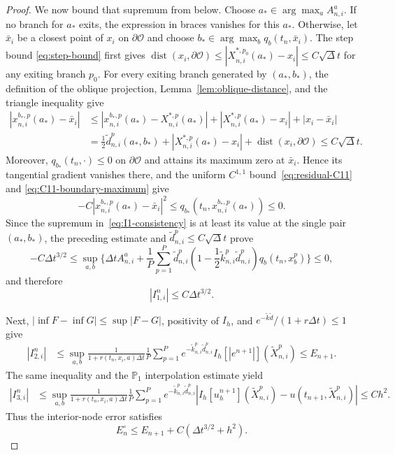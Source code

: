 \documentclass[10pt,a4paper]{amsart}
\newcommand{\cO}{\mathcal{O}}
\newcommand{\dist}{\operatorname{dist}}
\newcommand{\dt}{\Delta t}
\begin{document}
\begin{proof}
		We now bound that supremum from below.  Choose
		$a_*\in\arg\max_a A_{n,i}^a$.  If no branch for $a_*$ exits, the expression
		in braces vanishes for this $a_*$.  Otherwise, let $\bar x_i$ be a closest
		point of $x_i$ on $\partial\cO$ and choose
		$b_*\in\arg\max_b q_b(t_n,\bar x_i)$.  The step bound
		\eqref{eq:step-bound} first gives
		$\dist(x_i,\partial\cO)\le|X_{n,i}^{*,p_0}(a_*)-x_i|\le C\sqrt\dt$
		for any exiting branch $p_0$.  For every exiting branch generated by
		$(a_*,b_*)$, the definition of the oblique projection,
		Lemma~\ref{lem:oblique-distance}, and the triangle inequality give
		\[
		\begin{aligned}
			|x_{n,i}^{b_*,p}(a_*)-\bar x_i|
			&\le |x_{n,i}^{b_*,p}(a_*)-X_{n,i}^{*,p}(a_*)|
			+|X_{n,i}^{*,p}(a_*)-x_i|+|x_i-\bar x_i|\\
			&=\frac12\widetilde d_{n,i}^p(a_*,b_*)
			+|X_{n,i}^{*,p}(a_*)-x_i|
			+\dist(x_i,\partial\cO)
			\le C\sqrt\dt .
		\end{aligned}
		\]
		Moreover, $q_{b_*}(t_n,\cdot)\le0$ on $\partial\cO$ and attains its maximum
		zero at $\bar x_i$.  Hence its tangential gradient vanishes there, and the
		uniform $C^{1,1}$ bound~\eqref{eq:residual-C11} and
		\eqref{eq:C11-boundary-maximum} give
		\[
		-C|x_{n,i}^{b_*,p}(a_*)-\bar x_i|^2
		\le q_{b_*}(t_n,x_{n,i}^{b_*,p}(a_*))\le0.
		\]
		Since the supremum in~\eqref{eq:I1-consistency} is at least its value at
		the single pair $(a_*,b_*)$, the preceding estimate and
		$\widetilde d_{n,i}^p\le C\sqrt\dt$ prove
		\[
		-C\dt^{3/2}\le
		\sup_{a,b}\Biggl\{\dt A_{n,i}^a
		+\frac1P\sum_{p=1}^P\widetilde d_{n,i}^p
		\left(1-\frac12\widetilde k_{n,i}^p\widetilde d_{n,i}^p\right)
		q_b(t_n,x_b^p)\Biggr\}\le0,
		\]
		and therefore
		\begin{equation}
			|I_{1,i}^n|\le C\dt^{3/2}.
			\label{eq:I1-bound}
		\end{equation}
		
		Next, $|\inf F-\inf G|\le\sup|F-G|$, positivity of $I_h$, and
		$e^{-\widetilde k\widetilde d}/(1+r\dt)\le1$ give
		\begin{align}
			|I_{2,i}^n|
			&\le\sup_{a,b}
			\frac1{1+r(t_n,x_i,a)\dt}\frac1P\sum_{p=1}^P
			e^{-\widetilde k_{n,i}^p\widetilde d_{n,i}^p}
			I_h[|e^{n+1}|](\widetilde X_{n,i}^p)
			\le E_{n+1}.
			\label{eq:I2-bound}
		\end{align}
		The same inequality and the $\mathbb P_1$ interpolation estimate yield
		\begin{align}
			|I_{3,i}^n|
			&\le\sup_{a,b}
			\frac1{1+r(t_n,x_i,a)\dt}\frac1P\sum_{p=1}^P
			e^{-\widetilde k_{n,i}^p\widetilde d_{n,i}^p}
			\left|I_h[u_h^{n+1}](\widetilde X_{n,i}^p)
			-u(t_{n+1},\widetilde X_{n,i}^p)\right|
			\le Ch^2.
			\label{eq:I3-bound}
		\end{align}
		Thus the interior-node error satisfies
		\begin{equation}
			E_n^\circ\le E_{n+1}+C(\dt^{3/2}+h^2).
			\label{eq:smooth-interior-defect}
		\end{equation}
		

\end{proof}
\end{document}
